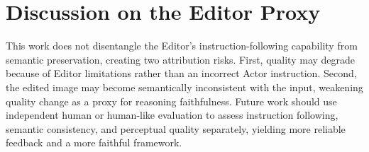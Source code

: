 \section{Discussion on the Editor Proxy}
\label{app:editor-proxy}

This work does not disentangle the Editor's instruction-following capability
from semantic preservation, creating two attribution risks. First, quality may
degrade because of Editor limitations rather than an incorrect Actor
instruction. Second, the edited image may become semantically inconsistent
with the input, weakening quality change as a proxy for reasoning faithfulness.
Future work should use independent human or human-like evaluation to assess
instruction following, semantic consistency, and perceptual quality
separately, yielding more reliable feedback and a more faithful framework.

